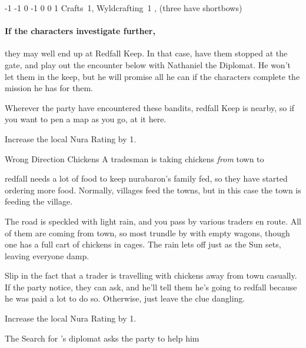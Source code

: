 \begin{multicols}{2}
  {-1}%
  {-1}%
  {{0}%
  {-1}%
  {0}}%
  {0}%
  {1}%
  {Crafts~1, Wyldcrafting~1}%
  {\Dagger, (three have shortbows)}%
  {}

\paragraph{If the characters investigate further,}
they may well end up at Redfall Keep.
In that case, have them stopped at the gate, and play out the encounter below with Nathaniel the Diplomat.
He won't let them in the keep, but he will promise all he can if the characters complete the mission he has for them.

Wherever the party have encountered these bandits, \gls{redfall} Keep is nearby, so if you want to pen a map as you go, at it here.

Increase the local Nura Rating by 1.

{\N Wrong Direction Chickens}%
{A tradesman is taking chickens \emph{from} town to }%

\Gls{redfall} needs a lot of food to keep \gls{nurabaron}'s family fed, so they have started ordering more food.
Normally, villages feed the towns, but in this case the town is feeding the village.

\begin{boxtext}

  The road is speckled with light rain, and you pass by various traders en route.
  All of them are coming from town, so most trundle by with empty wagons, though one has a full cart of chickens in cages.
  The rain lets off just as the Sun sets, leaving everyone damp.

\end{boxtext}

Slip in the fact that a trader is travelling with chickens away from \gls{town} casually.
If the party notice, they can ask, and he'll tell them he's going to \gls{redfall} because he was paid a lot to do so.
Otherwise, just leave the clue dangling.

Increase the local Nura Rating by 1.

\resumecontents[Town]

{The Search for }%
{'s diplomat asks the party to help him}%
\label{nonstarter}


\end{multicols}
